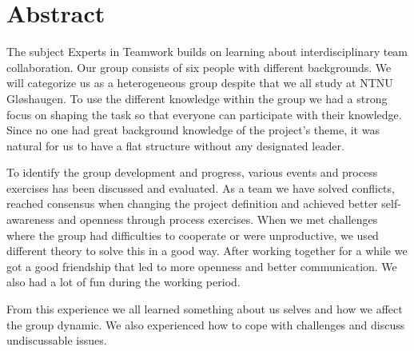 \section*{Abstract}

The subject Experts in Teamwork builds on learning about interdisciplinary team collaboration. Our group consists of six people with different backgrounds. We will categorize us as a heterogeneous group despite that we all study at NTNU Gløshaugen. To use the different knowledge within the group we had a strong focus on shaping the task so that everyone can participate with their knowledge. Since no one had great background knowledge of the project's theme, it was natural for us to have a flat structure without any designated leader. 

To identify the group development and progress, various events and process exercises has been discussed and evaluated. As a team we have solved conflicts, reached consensus when changing the project definition and achieved better self-awareness and openness through process exercises. When we met challenges where the group had difficulties to cooperate or were unproductive, we used different theory to solve this in a good way.  
After working together for a while we got a good friendship that led to more openness and better communication. We also had a lot of fun during the working period. 

From this experience we all learned something about us selves and how we affect the group dynamic.  We also experienced how to cope with challenges and discuss undiscussable issues. 




